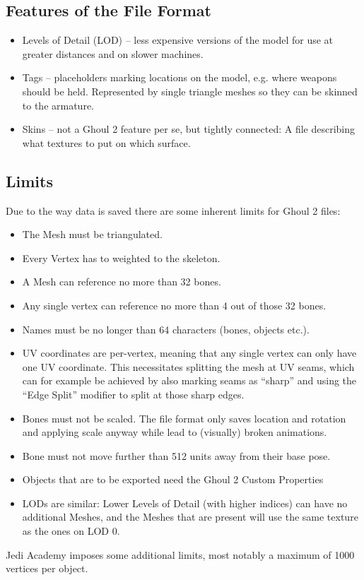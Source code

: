 \documentclass[a4paper,10pt]{article}
\begin{document}
 
 \subsection{Features of the File Format}
 \begin{itemize}
  \item Levels of Detail (LOD) -- less expensive versions of the model for use at greater distances and on
  slower machines.
  \item Tags -- placeholders marking locations on the model, e.g. where weapons should be held. Represented by
  single triangle meshes so they can be skinned to the armature.
  \item Skins -- not a Ghoul 2 feature per se, but tightly connected: A file describing what textures to put on
  which surface.
 \end{itemize}
 
 
 \subsection{Limits}
 
 Due to the way data is saved there are some inherent limits for Ghoul 2 files:
 \begin{itemize}
  \item The Mesh must be triangulated.
  \item Every Vertex has to weighted to the skeleton.
  \item A Mesh can reference no more than 32 bones.
  \item Any single vertex can reference no more than 4 out of those 32 bones.
  \item Names must be no longer than 64 characters (bones, objects etc.).
  \item UV coordinates are per-vertex, meaning that any single vertex can only have one UV coordinate. This
  necessitates splitting the mesh at UV seams, which can for example be achieved by also marking seams as
  ``sharp'' and using the ``Edge Split'' modifier to split at those sharp edges.
  \item Bones must not be scaled. The file format only saves location and rotation and applying scale anyway
  while lead to (visually) broken animations.
  \item Bone must not move further than 512 units away from their base pose.
  \item Objects that are to be exported need the Ghoul 2 Custom Properties
  \item LODs are similar: Lower Levels of Detail (with higher indices) can have no additional Meshes, and the
  Meshes that are present will use the same texture as the ones on LOD 0.
 \end{itemize}
 Jedi Academy imposes some additional limits, most notably a maximum of 1000 vertices per object.
 
\end{document}
